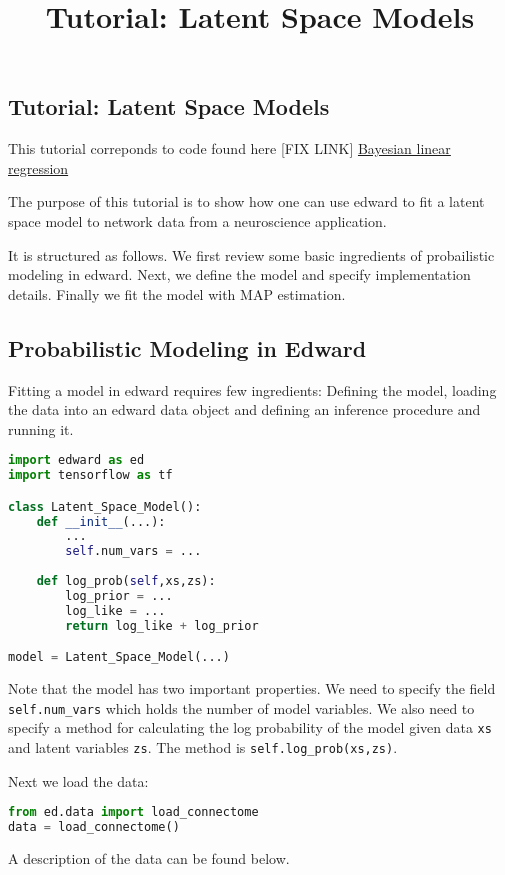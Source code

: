 \title{Tutorial: Latent Space Models}

\subsection{Tutorial: Latent Space Models}

This tutorial correponds to code found here [FIX LINK]
  \href{https://github.com/blei-lab/edward/blob/master/examples/bayesian_linear_regression.py}{Bayesian
  linear regression}

The purpose of this tutorial is to show how one can use edward to fit a latent space model to network data from a neuroscience application.

It is structured as follows.
We first review some basic ingredients of probailistic modeling in edward.
Next, we define the model and specify implementation details. 
Finally we fit the model with MAP estimation.

\subsection{Probabilistic Modeling in Edward}
Fitting a model in edward requires few ingredients: Defining the model, loading the data into an edward data object and defining an inference procedure and running it.

\begin{lstlisting}[language=Python]
import edward as ed
import tensorflow as tf

class Latent_Space_Model():
    def __init__(...):
        ...
        self.num_vars = ...
 
    def log_prob(self,xs,zs):
        log_prior = ...
        log_like = ...
        return log_like + log_prior

model = Latent_Space_Model(...)
\end{lstlisting}
Note that the model has two important properties. We need to specify the field \texttt{self.num\_vars} which holds the number of model variables. We also need to specify a method for calculating the log probability of the model given data \texttt{xs} and latent variables \texttt{zs}. The method is \texttt{self.log_prob(xs,zs)}.

Next we load the data:
\begin{lstlisting}[language=Python]
from ed.data import load_connectome
data = load_connectome()
\end{lstlisting}
A description of the data can be found below.

